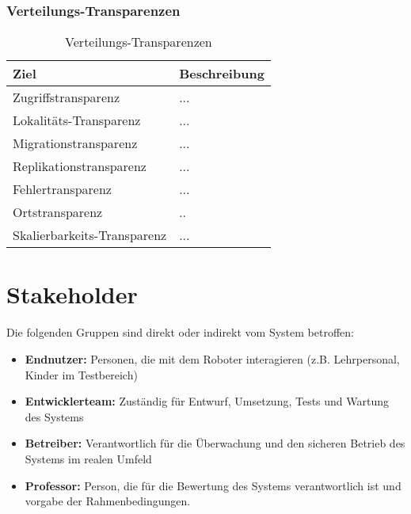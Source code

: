 \subsubsection{Verteilungs-Transparenzen}
    \begin{table}[h!]
            \centering
            \begin{tabular}{p{4cm}|p{10cm}}
                \hline
                \textbf{Ziel} & \textbf{Beschreibung} \\
                \hline
                Zugriffstransparenz   & ...\\
                Lokalitäts-Transparenz  & ...\\
                Migrationstransparenz & ...\\
                Replikationstransparenz &...\\
                Fehlertransparenz &... \\
                Ortstransparenz & .. \\
                Skalierbarkeits-Transparenz &...\\
                \hline
            \end{tabular}
            \caption{Verteilungs-Transparenzen}
            \label{tab:qualitaetsziele}
        \end{table}
        



\clearpage
\section{Stakeholder}
Die folgenden Gruppen sind direkt oder indirekt vom System betroffen:

\begin{itemize}
    \item \textbf{Endnutzer:} Personen, die mit dem Roboter interagieren (z.B. Lehrpersonal, Kinder im Testbereich)
    \item \textbf{Entwicklerteam:} Zuständig für Entwurf, Umsetzung, Tests und Wartung des Systems
    \item \textbf{Betreiber:} Verantwortlich für die Überwachung und den sicheren Betrieb des Systems im realen Umfeld
    \item \textbf{Professor:} Person, die für die Bewertung des Systems verantwortlich ist und vorgabe der Rahmenbedingungen.

\end{itemize}
